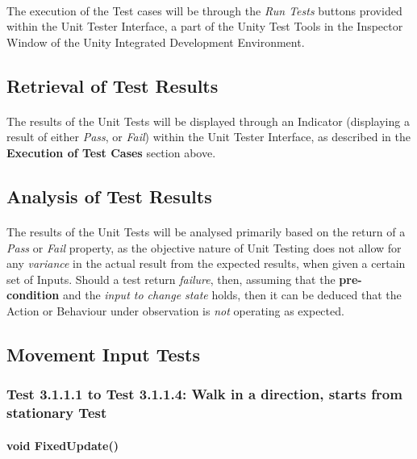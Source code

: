 \documentclass{article}
\begin{document}
    \paragraph{} The execution of the Test cases will be through the \emph{Run Tests} buttons provided within the Unit Tester Interface, a part of the Unity Test Tools in the Inspector Window of the Unity Integrated Development Environment.
    
    \subsection{Retrieval of Test Results} 
    \paragraph{}The results of the Unit Tests will be displayed through an Indicator (displaying a result of either \emph{Pass}, or \emph{Fail}) within the Unit Tester Interface, as described in the \textbf{Execution of Test Cases} section above.
    
    \subsection{Analysis of Test Results}
    \paragraph{} The results of the Unit Tests will be analysed primarily based on the return of a \emph{Pass} or \emph{Fail} property, as the objective nature of Unit Testing does not allow for any \emph{variance} in the actual result from the expected results, when given a certain set of Inputs. Should a test return \emph{failure}, then, assuming that the \textbf{pre-condition} and the \emph{input to change state} holds, then it can be deduced that the Action or Behaviour under observation is \emph{not} operating as expected.
    
    \subsection{Movement Input Tests}
    \subsubsection{Test 3.1.1.1 to Test  3.1.1.4: Walk in a direction, starts from stationary Test}
    \paragraph{}\textbf{void FixedUpdate()}
\end{document}
